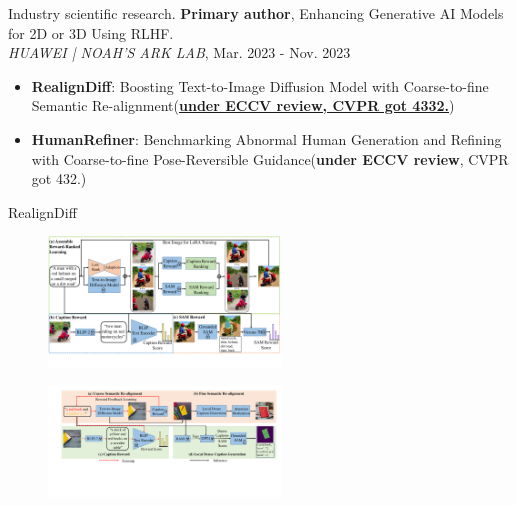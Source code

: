 \documentclass[8pt]{beamer}
\begin{document}
\begin{frame}{Industry scientific research.}
\textbf{Primary author}, Enhancing Generative AI Models for 2D or 3D Using RLHF.\\
\textit{HUAWEI | NOAH'S ARK LAB}, Mar. 2023 - Nov. 2023
\begin{itemize}
\item {\textbf{RealignDiff}: Boosting Text-to-Image Diffusion Model with Coarse-to-fine Semantic Re-alignment(\href{https://arxiv.org/abs/2305.19599}{\textbf{under ECCV review, CVPR got 4332.}})}
        \item {\textbf{HumanRefiner}: Benchmarking Abnormal Human Generation and Refining with Coarse-to-fine Pose-Reversible Guidance(\textbf{under ECCV review}, CVPR got 432.)}
\end{itemize}

\end{frame}
\begin{frame}{RealignDiff}
    \begin{figure}
        \centering
\includegraphics[width=0.55\textwidth]{demo/framework.pdf}
    \end{figure}
    \begin{figure}
        \centering
\includegraphics[width=0.55\textwidth]{demo/framework_1.pdf}
    \end{figure}
\end{frame}
\end{document}
